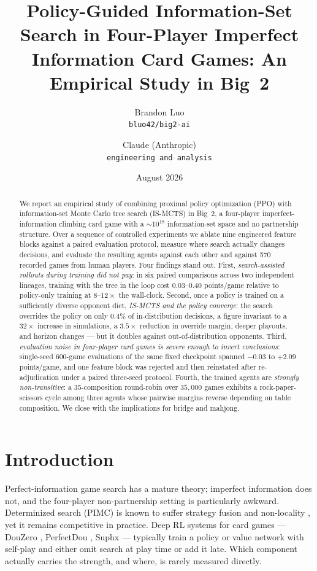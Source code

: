 \documentclass[11pt]{article}
\title{Policy-Guided Information-Set Search in Four-Player Imperfect
Information Card Games: An Empirical Study in Big~2}
\author{%
  Brandon Luo\\
  \texttt{bluo42/big2-ai}
  \and
  Claude (Anthropic)\\
  \texttt{engineering and analysis}
}
\date{August 2026}
\begin{document}
\maketitle

\begin{abstract}
We report an empirical study of combining proximal policy optimization
(PPO) with information-set Monte Carlo tree search (IS-MCTS) in Big~2,
a four-player imperfect-information climbing card game with a
$\sim 10^{18}$ information-set space and no partnership structure. Over
a sequence of controlled experiments we ablate nine engineered feature
blocks against a paired evaluation protocol, measure where search
actually changes decisions, and evaluate the resulting agents against
each other and against 570 recorded games from human players. Four
findings stand out. First, \emph{search-assisted rollouts during
training did not pay}: in six paired comparisons across two independent
lineages, training with the tree in the loop cost $0.03$--$0.40$
points/game relative to policy-only training at $8$--$12\times$ the
wall-clock. Second, once a policy is trained on a sufficiently diverse
opponent diet, \emph{IS-MCTS and the policy converge}: the search
overrides the policy on only $0.4\%$ of in-distribution decisions, a
figure invariant to a $32\times$ increase in simulations, a $3.5\times$
reduction in override margin, deeper playouts, and horizon changes ---
but it doubles against out-of-distribution opponents. Third,
\emph{evaluation noise in four-player card games is severe enough to
invert conclusions}: single-seed 600-game evaluations of the same fixed
checkpoint spanned $-0.03$ to $+2.09$ points/game, and one feature block
was rejected and then reinstated after re-adjudication under a paired
three-seed protocol. Fourth, the trained agents are \emph{strongly
non-transitive}: a 35-composition round-robin over $35{,}000$ games
exhibits a rock-paper-scissors cycle among three agents whose pairwise
margins reverse depending on table composition. We close with the
implications for bridge and mahjong.
\end{abstract}

\section{Introduction}

Perfect-information game search has a mature theory; imperfect
information does not, and the four-player non-partnership setting is
particularly awkward. Determinized search (PIMC) is known to suffer
strategy fusion and non-locality \citep{frank1998,long2010}, yet it
remains competitive in practice. Deep RL systems for card games ---
DouZero \citep{zha2021}, PerfectDou \citep{yang2022}, Suphx
\citep{li2020} --- typically train a policy or value network with
self-play and either omit search at play time or add it late. Which
component actually carries the strength, and where, is rarely measured
directly.
\end{document}
